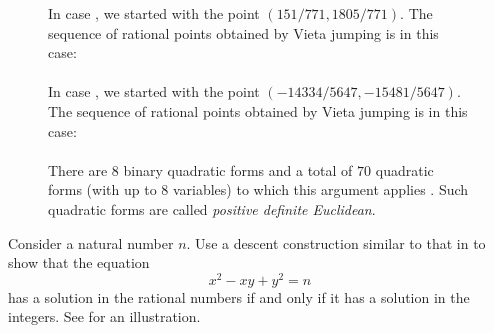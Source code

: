 \begin{routine}
\begin{figure}[tbp]
{      In case , we started with the point $(151/771,1805/771)$. The sequence of rational points obtained by Vieta jumping is in this case:
      \\[\abovedisplayskip]
      \\[\belowdisplayskip]
      In case , we started with the point $(-14334/5647,-15481/5647)$. The sequence of rational points obtained by Vieta jumping is in this case:
      \\[\abovedisplayskip]
      \\[\belowdisplayskip]
      There are $8$ binary quadratic forms and a total of $70$ quadratic forms (with up to $8$ variables) to which this argument applies \cite{Nebe2003}. Such quadratic forms are called \emph{positive definite Euclidean}.
    }
    \label{figure:aubrys-theorem-two-euclidean-forms}
  \end{figure}
  \exercise Consider a natural number $n$. Use a descent construction similar to that in  to show that the equation
  \begin{equation*}
    x^2-xy+y^2=n
  \end{equation*}
  has a solution in the rational numbers if and only if it has a solution in the integers. See  for an illustration.
\end{routine}

